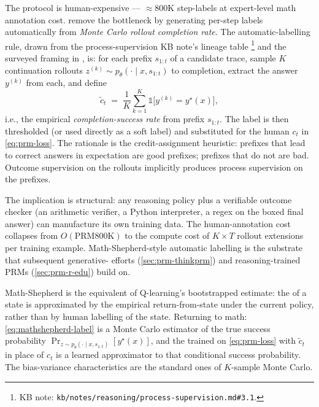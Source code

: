 The  protocol is human-expensive --- $\approx 800$K step-labels
at expert-level math annotation cost. \citet{wang2024-mathshepherd}
remove the bottleneck by generating per-step labels automatically from
\emph{Monte Carlo rollout completion rate}. The
automatic-labelling rule, drawn from the
process-supervision KB note's lineage table%
\footnote{KB note: \texttt{kb/notes/reasoning/process-supervision.md\#3.1}.}
and the surveyed framing in \citet{zheng2025-prm-survey}, is: for each
prefix $s_{1:t}$ of a candidate trace, sample $K$ continuation rollouts
$z^{(k)} \sim p_\theta(\cdot \mid x, s_{1:t})$ to completion, extract
the answer $y^{(k)}$ from each, and define
\begin{equation}
  \tilde c_t \;=\; \frac{1}{K} \sum_{k=1}^{K} \mathbb{1}\!\bigl[y^{(k)} = y^\star(x)\bigr],
  \label{eq:mathshepherd-label}
\end{equation}
i.e., the empirical \emph{completion-success rate} from prefix
$s_{1:t}$. The label is then thresholded (or used directly as a soft
label) and substituted for the human $c_t$ in \cref{eq:prm-loss}. The
rationale is the credit-assignment heuristic: prefixes that lead to
correct answers in expectation are good prefixes; prefixes that do
not are bad. Outcome supervision on the rollouts implicitly produces
process supervision on the prefixes.

The implication is structural: any reasoning policy plus a verifiable
outcome checker (an arithmetic verifier, a Python interpreter, a
regex on the boxed final answer) can manufacture its own  training
data. The human-annotation cost collapses from $O(\text{PRM800K})$
to the compute cost of $K \times T$ rollout extensions per training
example. Math-Shepherd-style automatic labelling is the substrate
that subsequent generative- efforts (\cref{sec:prm-thinkprm}) and
reasoning-trained PRMs (\cref{sec:prm-r-edu}) build on.

\begin{analogy}
Math-Shepherd is the  equivalent of Q-learning's bootstrapped
 estimate: the  of a state is approximated by the
empirical return-from-state under the current policy, rather than by
human labelling of the state. Returning to math: \cref{eq:mathshepherd-label}
is a Monte Carlo estimator of the true success probability
$\Pr_{z \sim p_\theta(\cdot \mid x, s_{1:t})}[y^\star(x)]$, and the
 trained on \cref{eq:prm-loss} with $\tilde c_t$ in place of $c_t$
is a learned approximator to that conditional success probability.
The bias-variance characteristics are the standard ones of $K$-sample
Monte Carlo.
\end{analogy}

